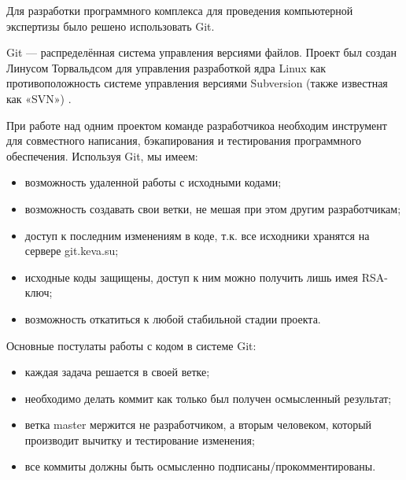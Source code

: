 Для разработки программного комплекса для проведения компьютерной экспертизы было решено использовать Git.

Git --- распределённая система управления версиями файлов. Проект был создан Линусом Торвальдсом для управления разработкой ядра Linux  как противоположность  системе управления версиями Subversion (также известная как «SVN») \cite{progit}.

При работе над одним проектом команде разработчикоа необходим инструмент для совместного написания, бэкапирования и тестирования программного обеспечения. Используя Git, мы имеем:
\begin{itemize}
\item возможность удаленной работы с исходными кодами;
\item возможность создавать свои ветки, не мешая при этом другим разработчикам;
\item доступ к последним изменениям в коде, т.к. все исходники хранятся на сервере git.keva.su;
\item исходные коды защищены, доступ к ним можно получить лишь имея RSA-ключ;
\item возможность откатиться к любой стабильной стадии проекта.
\end{itemize}

Основные постулаты работы с кодом в системе Git:

\begin{itemize}
\item каждая задача решается в своей ветке;
\item необходимо делать коммит как только был получен осмысленный результат;
\item ветка master мержится не разработчиком, а вторым человеком, который производит вычитку и тестирование изменения;
\item все коммиты должны быть осмысленно подписаны/прокомментированы.
\end{itemize}

